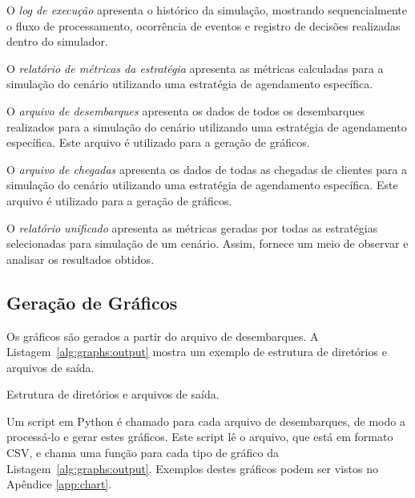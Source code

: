 \begin{description}[leftmargin=!,labelwidth=\widthof{\bfseries Arquivo de Desembarques}]\setlength\itemsep{0mm}
\item[Log de Execução]
O \textit{log de execução} apresenta o histórico da simulação,
mostrando sequencialmente o fluxo de processamento, ocorrência de eventos e
registro de decisões realizadas dentro do simulador.

\item[Métricas da Estratégia]
O \textit{relatório de métricas da estratégia} apresenta as métricas calculadas
para a simulação do cenário utilizando uma estratégia de agendamento específica.

\item[Arquivo de Desembarques]
O \textit{arquivo de desembarques} apresenta os dados de todos os desembarques
realizados para a simulação do cenário utilizando uma estratégia de agendamento
específica. Este arquivo é utilizado para a geração de gráficos.

\item[Arquivo de Chegadas]
O \textit{arquivo de chegadas} apresenta os dados de todas as chegadas de
clientes para a simulação do cenário utilizando uma estratégia de agendamento
específica. Este arquivo é utilizado para a geração de gráficos.

\item[Relatório Unificado]
O \textit{relatório unificado} apresenta as métricas geradas por todas as
estratégias selecionadas para simulação de um cenário. Assim, fornece um meio de
observar e analisar os resultados obtidos.

\end{description}

\subsection{\label{model:report:charts}Geração de Gráficos}

Os gráficos são gerados a partir do arquivo de desembarques. A
Listagem~\ref{alg:graphs:output} mostra um exemplo de estrutura de diretórios e
arquivos de saída.

\begin{listing}[H]
\caption
   {\label{alg:graphs:output}Estrutura de diretórios e arquivos de saída.}
\end{listing}

Um script em Python é chamado para cada arquivo de desembarques, de modo a
processá-lo e gerar estes gráficos. Este script lê o arquivo, que está em
formato CSV, e chama uma função para cada tipo de gráfico da
Listagem~\ref{alg:graphs:output}. Exemplos destes gráficos podem ser vistos no
Apêndice \ref{app:chart}.
